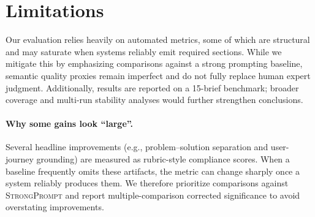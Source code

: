 \section*{Limitations}

Our evaluation relies heavily on automated metrics, some of which are structural and may saturate when systems reliably emit required sections.
While we mitigate this by emphasizing comparisons against a strong prompting baseline, semantic quality proxies remain imperfect and do not fully replace human expert judgment.
Additionally, results are reported on a 15-brief benchmark; broader coverage and multi-run stability analyses would further strengthen conclusions.

\paragraph{Why some gains look ``large''.}
Several headline improvements (e.g., problem--solution separation and user-journey grounding) are measured as rubric-style compliance scores.
When a baseline frequently omits these artifacts, the metric can change sharply once a system reliably produces them.
We therefore prioritize comparisons against \textsc{StrongPrompt} and report multiple-comparison corrected significance to avoid overstating improvements.



